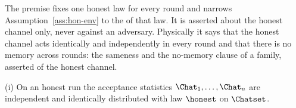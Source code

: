 
The premise fixes one honest law for every round and narrows
Assumption~\ref{ass:hon-env} to the  of that law. It
is asserted about the honest channel only, never against an adversary.
Physically it says that the honest channel acts identically and independently
in every round and that there is no memory across rounds: the sameness and
the no-memory clause of a  family, asserted of the
honest channel.

\begin{assumption}\label{ass:hon}
(i) On an honest run the acceptance statistics $\Chat_1,\dots,\Chat_n$ are
independent and identically distributed with law $\honest$ on $\Chatset$.
\end{assumption}
